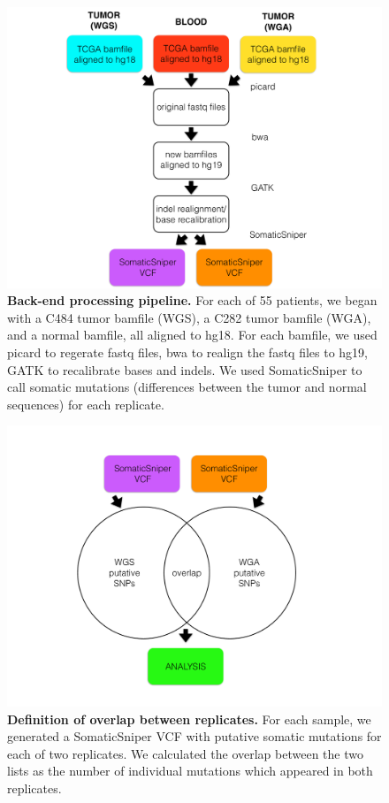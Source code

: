 \documentclass[11pt]{article} %
\begin{document}
\begin{figure}
\centerline{
\includegraphics[width=6in]{figure1.pdf} }
\caption{\textbf{Back-end processing pipeline.} For each of 55 patients, we began with a C484 tumor bamfile (WGS), a C282 tumor bamfile (WGA), and a normal bamfile, all aligned to hg18. For each bamfile, we used picard to regerate fastq files, bwa to realign the fastq files to hg19, GATK to recalibrate bases and indels. We used SomaticSniper to call somatic mutations (differences between the tumor and normal sequences) for each replicate.}
\end{figure}

\begin{figure}
\centerline{
\includegraphics[width=6in]{figure2.pdf} }
\caption{\textbf{Definition of overlap between replicates.} For each sample, we generated a SomaticSniper VCF with putative somatic mutations for each of two replicates. We calculated the overlap between the two lists as the number of individual mutations which appeared in both replicates.}
\end{figure}
\end{document}
